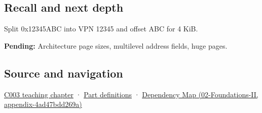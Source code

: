 \subsection{Recall and next depth}\label{recall-and-next-depth}

Split 0x12345ABC into VPN 12345 and offset ABC for 4 KiB.

\textbf{Pending:} Architecture page sizes, multilevel address fields, huge pages.

\subsection{Source and navigation}\label{source-and-navigation}

\href{Continuous\%20Notes/Computing\%20Foundations\%20-\%20From\%20Bits\%20to\%20C++\%20and\%20Systems\%20APIs\#Where\%20the\%20bytes\%20live}{C003 teaching chapter} · \hyperref[appendix-fd090d982a15]{Part definitions} · \href{}{Dependency Map (02-Foundations-II, appendix-4ad47bdd269a)}
